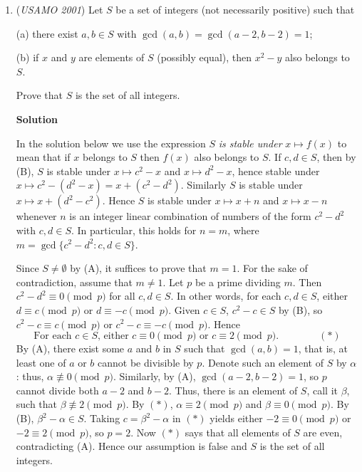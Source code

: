 \begin{enumerate}
 


	\item (\textit{USAMO 2001}) Let $S$ be a set of integers (not necessarily positive) such that


 (a) there exist $a,b \in S$ with $\gcd(a,b) = \gcd(a - 2,b - 2) = 1$;


 (b) if $x$ and $y$ are elements of $S$ (possibly equal), then $x^2 - y$ also belongs to $S$. 


 Prove that $S$ is the set of all integers.


 



\textbf{Solution}

In the solution below we use the expression $S$ \textit{is stable under} $x\mapsto f(x)$ to mean that if $x$ belongs to $S$ then $f(x)$ also belongs to $S$. If $c,d\in S$, then by (B), $S$ is stable under $x\mapsto c^2 - x$ and $x\mapsto d^2 - x$, hence stable under $x\mapsto c^2 - (d^2 - x) = x + (c^2 - d^2)$. Similarly $S$ is stable under $x\mapsto x + (d^2 - c^2)$. Hence $S$ is stable under $x\mapsto x + n$ and $x\mapsto x - n$ whenever $n$ is an integer linear combination of numbers of the form $c^2 - d^2$ with $c,d\in S$. In particular, this holds for $n = m$, where $m = \gcd\{c^2 - d^2 : c,d\in S\}$.

 Since $S\neq \emptyset$ by (A), it suffices to prove that $m = 1$. For the sake of contradiction, assume that $m\neq 1$. Let $p$ be a prime dividing $m$. Then $c^2 - d^2\equiv 0\pmod{p}$ for all $c,d\in S$. In other words, for each $c,d\in S$, either $d\equiv c\pmod{p}$ or $d\equiv -c\pmod{p}$. Given $c\in S$, $c^2 - c\in S$ by (B), so $c^2 - c\equiv c\pmod{p}$ or $c^2 - c\equiv -c\pmod{p}$. Hence
 \[\text{For each }c\in S\text{, either }c\equiv 0\pmod{p}\text{ or }c\equiv 2\pmod{p}.\qquad\qquad (*)\]By (A), there exist some $a$ and $b$ in $S$ such that $\gcd(a,b) = 1$, that is, at least one of $a$ or $b$ cannot be divisible by $p$. Denote such an element of $S$ by $\alpha$: thus, $\alpha\not\equiv 0\pmod{p}$. Similarly, by (A), $\gcd(a - 2, b - 2) = 1$, so $p$ cannot divide both $a - 2$ and $b - 2$. Thus, there is an element of $S$, call it $\beta$, such that $\beta\not\equiv 2\pmod{p}$. By $(*)$, $\alpha\equiv 2\pmod{p}$ and $\beta\equiv 0\pmod{p}$. By (B), $\beta^2 - \alpha\in S$. Taking $c = \beta^2 - \alpha$ in $(*)$ yields either $-2\equiv 0\pmod{p}$ or $-2\equiv 2\pmod{p}$, so $p = 2$. Now $(*)$ says that all elements of $S$ are even, contradicting (A). Hence our assumption is false and $S$ is the set of all integers.


\end{enumerate}
